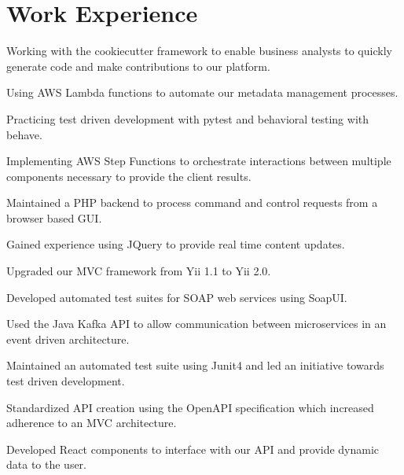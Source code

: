 \documentclass[letterpaper]{deedy-resume}
\begin{document}
\begin{minipage}[t]{0.66\textwidth} %
\section{Work Experience}
\vspace{\topsep} %
\begin{tightitemize}
\item Working with the cookiecutter framework to enable business analysts to quickly generate code and make contributions to our platform.
\item Using AWS Lambda functions to automate our metadata management processes.
\item Practicing test driven development with pytest and behavioral testing with behave.
\item Implementing AWS Step Functions to orchestrate interactions between multiple components necessary to provide the client results.
\end{tightitemize}

\sectionspace
{}
\begin{tightitemize}
\item Maintained a PHP backend to process command and control requests from a browser based GUI.
\item Gained experience using JQuery to provide real time content updates.
\item Upgraded our MVC framework from Yii 1.1 to Yii 2.0.
\item Developed automated test suites for SOAP web services using SoapUI.
\end{tightitemize}

\sectionspace
{}
\begin{tightitemize}
\item Used the Java Kafka API to allow communication between microservices in an event driven architecture.
\item Maintained an automated test suite using Junit4 and led an initiative towards test driven development.
\item Standardized API creation using the OpenAPI specification which increased adherence to an MVC architecture.
\item Developed React components to interface with our API and provide dynamic data to the user.
\end{tightitemize}


\end{minipage}
\end{document}
